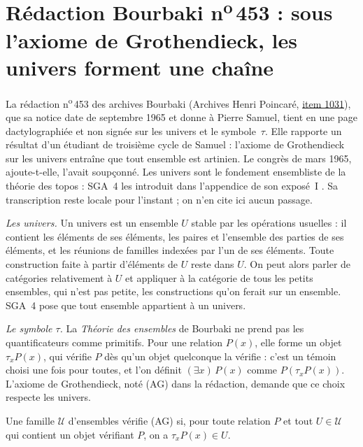 \section[Rédaction Bourbaki n\textsuperscript{o}\,453 : les univers forment une chaîne]{Rédaction Bourbaki n\textsuperscript{o}\,453 : sous l'axiome de Grothendieck, les univers forment une chaîne\protect{}}\label{sec:bourbaki-453}

La rédaction n\textsuperscript{o}\,453 des archives Bourbaki (Archives Henri Poincaré, \href{https://archives-bourbaki.ahp-numerique.fr/items/show/1031}{item 1031}), que sa notice date de septembre 1965 et donne à Pierre Samuel, tient en une page dactylographiée et non signée sur les univers et le symbole~$\tau$. Elle rapporte un résultat d'un étudiant de troisième cycle de Samuel : l'axiome de Grothendieck sur les univers entraîne que tout ensemble est artinien. Le congrès de mars 1965, ajoute-t-elle, l'avait soupçonné. Les univers sont le fondement ensembliste de la théorie des topos : SGA~4 les introduit dans l'appendice de son exposé~I \cite{sga4-1}. Sa transcription reste locale pour l'instant ; on n'en cite ici aucun passage.

\emph{Les univers.} Un univers est un ensemble $U$ stable par les opérations usuelles : il contient les éléments de ses éléments, les paires et l'ensemble des parties de ses éléments, et les réunions de familles indexées par l'un de ses éléments. Toute construction faite à partir d'éléments de $U$ reste dans $U$. On peut alors parler de catégories  relativement à $U$ et appliquer à la catégorie de tous les petits ensembles, qui n'est pas petite, les constructions qu'on ferait sur un ensemble. SGA~4 pose que tout ensemble appartient à un univers.

\emph{Le symbole $\tau$.} La \emph{Théorie des ensembles} de Bourbaki ne prend pas les quantificateurs comme primitifs. Pour une relation $P(x)$, elle forme un objet $\tau_x P(x)$, qui vérifie $P$ dès qu'un objet quelconque la vérifie : c'est un témoin choisi une fois pour toutes, et l'on définit $(\exists x)\,P(x)$ comme $P(\tau_x P(x))$. L'axiome de Grothendieck, noté (AG) dans la rédaction, demande que ce choix respecte les univers.

\begin{definition}
Une famille $\mathcal U$ d'ensembles vérifie (AG) si, pour toute relation $P$ et tout $U \in \mathcal U$ qui contient un objet vérifiant $P$, on a $\tau_x P(x) \in U$.
\end{definition}

